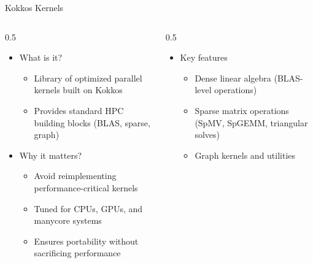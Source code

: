 \documentclass[
    aspectratio=169,
]{beamer}
\begin{document}
\begin{frame}{Kokkos Kernels}
    \begin{columns}
        \begin{column}{0.5\linewidth}
            \begin{itemize}
                \item What is it?
                \begin{itemize}
                    \item Library of optimized parallel kernels built on Kokkos
                    \item Provides standard HPC building blocks (BLAS, sparse, graph)
                \end{itemize}
                \item Why it matters?
                \begin{itemize}
                    \item Avoid reimplementing performance-critical kernels
                    \item Tuned for CPUs, GPUs, and manycore systems
                    \item Ensures portability without sacrificing performance
                \end{itemize}
            \end{itemize}
        \end{column}
        \begin{column}{0.5\linewidth}
            \begin{itemize}
                \item Key features
                \begin{itemize}
                    \item Dense linear algebra (BLAS-level operations)
                    \item Sparse matrix operations (SpMV, SpGEMM, triangular solves)
                    \item Graph kernels and utilities
                \end{itemize}
            \end{itemize}
        \end{column}
    \end{columns}
\end{frame}
\end{document}
